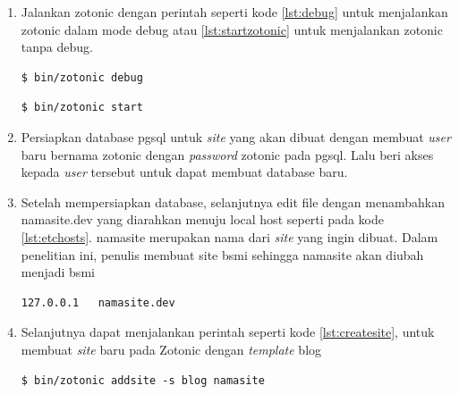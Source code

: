 \begin{enumerate}
	\item Jalankan zotonic dengan perintah seperti kode \ref{lst:debug} untuk menjalankan zotonic dalam mode debug atau \ref{lst:startzotonic} untuk menjalankan zotonic tanpa debug.
	
	\begin{minipage}{\linewidth}
		\begin{lstlisting}[caption={Perintah untuk menjalankan Zotonic pada mode debug},label={lst:debug}]
		$ bin/zotonic debug
		\end{lstlisting}
	\end{minipage}

	\begin{minipage}{\linewidth}
		\begin{lstlisting}[caption={Perintah untuk menjalankan Zotonic tanpa mode debug},label={lst:startzotonic}]
		$ bin/zotonic start
		\end{lstlisting}
	\end{minipage}

	\item Persiapkan database pgsql untuk \textit{site} yang akan dibuat dengan membuat \textit{user} baru bernama zotonic dengan \textit{password} zotonic pada pgsql. Lalu beri akses kepada \textit{user} tersebut untuk dapat membuat database baru.
	
	\item Setelah mempersiapkan database, selanjutnya edit file  dengan menambahkan namasite.dev yang diarahkan menuju local host seperti pada kode \ref{lst:etchosts}. namasite merupakan nama dari \textit{site} yang ingin dibuat. Dalam penelitian ini, penulis membuat site bsmi sehingga namasite akan diubah menjadi bsmi
	\begin{minipage}{\linewidth}
		\begin{lstlisting}[caption={Configurasi file /etc/hosts},label={lst:etchosts}]
		127.0.0.1   namasite.dev
		\end{lstlisting}
	\end{minipage}

	\item Selanjutnya dapat menjalankan perintah seperti kode \ref{lst:createsite}, untuk membuat \textit{site} baru pada Zotonic dengan \textit{template} blog
	\begin{minipage}{\linewidth}
		\begin{lstlisting}[caption={Perintah untuk membuat \textit{site} baru pada Zotonic},label={lst:createsite}]
		$ bin/zotonic addsite -s blog namasite
		\end{lstlisting}
	\end{minipage}


\end{enumerate}
